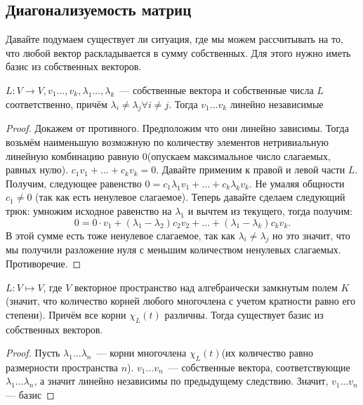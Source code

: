 \subsection{Диагонализуемость матриц}
\begin{motivation}
    Давайте подумаем существует ли ситуация, где мы можем рассчитывать на то, что любой вектор раскладывается в сумму собственных.
    Для этого нужно иметь базис из собственных векторов.
\end{motivation}
\begin{theorem}
    $L: V\rightarrow V, v_1\dots, v_k, \lambda_1\dots, \lambda_k$~--- собственные вектора и собственные числа $L$ соответственно, причём
    $\lambda_i\not= \lambda_j \forall i\not= j$.
    Тогда $v_1\dots v_k$ линейно независимые
\end{theorem}
\begin{proof}
    Докажем от противного. Предположим что они линейно зависимы. Тогда возьмём наименьшую возможную по количеству элементов
    нетривиальную линейную комбинацию равную 0(опускаем максимальное число слагаемых, равных нулю).
    $c_1v_1+\dots+c_k v_k = 0$. Давайте применим к правой и левой части $L$. Получим, следующее равенство
    $0 = c_1\lambda_1v_1+\dots + c_k\lambda_k v_k$. Не умаляя общности $c_1\not=0$ (так как есть ненулевое слагаемое).
    Теперь давайте сделаем следующий трюк: умножим исходное равенство на $\lambda_1$ и вычтем из текущего, тогда получим:
    \[
    0 = 0\cdot v_1 + (\lambda_1 - \lambda_2)c_2v_2 + \dots + (\lambda_1 - \lambda_k) c_k v_k
    .\]
    В этой сумме есть тоже ненулевое слагаемое, так как $\lambda_i \not= \lambda_j$ но это значит, что мы получили
    разложение нуля с меньшим количеством ненулевых слагаемых. Противоречие.
\end{proof}
\begin{follow}
    $L\colon V \mapsto V$, где $V$ векторное пространство над алгебраически замкнутым полем $K$(значит, что количество корней
    любого многочлена с учетом кратности равно его степени).
    Причём все корни $\chi_L(t)$ различны.
    Тогда существует базис из собственных векторов.
\end{follow}
\begin{proof}
    Пусть $\lambda_1\dots \lambda_n$~--- корни многочлена $\chi_L(t)$(их количество равно размерности пространства $n$).
    $v_1\dots v_n$~--- собственные вектора, соответствующие $\lambda_1\dots \lambda_n$, а значит линейно независимы по предыдущему следствию. Значит, $v_1\dots v_n$ --- базис 
\end{proof}
